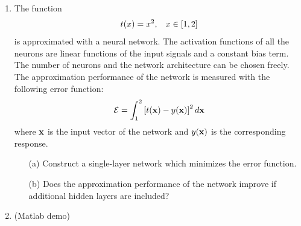 \documentclass[10pt]{article}
\newcommand{\vect}[1]{{\bf{#1}}}
\begin{document}
\begin{enumerate}
\vspace{2mm}

\item The function
\[
t(x) = x^2, \hspace{3mm} x \in \left[ 1, 2 \right]
\]
is approximated with a neural network. The activation functions of all
the neurons are linear functions of the input signals and a constant
bias term. The number of neurons and the network architecture can be
chosen freely. The approximation performance of the network is
measured with the following error function:
\[
\mathcal{E} = \int_{1}^2 \left[ t({\bf x})-y({\bf x}) \right]^2 d{\bf x}
\]
where $\vect{x}$ is the input vector of the network and $y(\vect{x})$ is the
corresponding response.
\begin{itemize}
\item[(a)] Construct a single-layer network which minimizes the error function.
\item[(b)] Does the approximation performance of the network improve if
  additional hidden layers are included?
\end{itemize}

\vspace{2mm}

\item (Matlab demo)

\end{enumerate}
\end{document}
